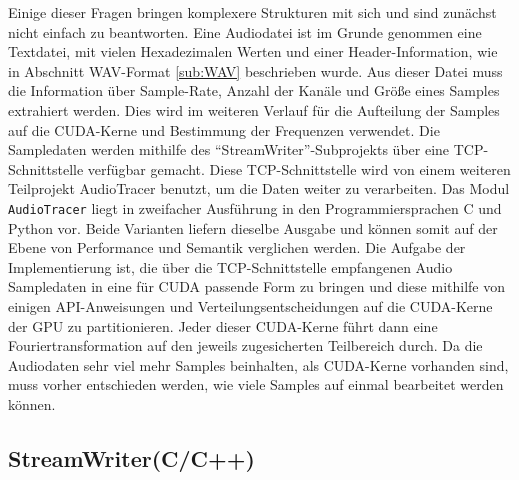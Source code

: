 Einige dieser Fragen bringen komplexere Strukturen mit sich und sind zunächst nicht einfach zu beantworten.
Eine Audiodatei ist im Grunde genommen eine Textdatei, mit vielen Hexadezimalen Werten und einer Header-Information, wie in Abschnitt WAV-Format \ref{sub:WAV} beschrieben wurde.
Aus dieser Datei muss die Information über Sample-Rate, Anzahl der Kanäle und Größe eines Samples extrahiert werden. Dies wird im weiteren Verlauf für die Aufteilung der Samples auf die CUDA-Kerne und Bestimmung der Frequenzen verwendet.
Die Sampledaten werden mithilfe des \enquote{StreamWriter}-Subprojekts über eine TCP-Schnittstelle verfügbar gemacht. Diese TCP-Schnittstelle wird von einem weiteren Teilprojekt AudioTracer benutzt, um die Daten weiter zu verarbeiten.
Das Modul \texttt{AudioTracer} liegt in zweifacher Ausführung in den Programmiersprachen C und Python vor. Beide Varianten liefern dieselbe Ausgabe und können somit auf der Ebene von Performance und Semantik verglichen werden. 
Die Aufgabe der Implementierung ist, die über die TCP-Schnittstelle empfangenen Audio Sampledaten in eine für CUDA passende Form zu bringen und diese mithilfe von einigen API-Anweisungen und Verteilungsentscheidungen auf die CUDA-Kerne der GPU zu partitionieren.
Jeder dieser CUDA-Kerne führt dann eine Fouriertransformation auf den jeweils zugesicherten Teilbereich durch. Da die Audiodaten sehr viel mehr Samples beinhalten, als CUDA-Kerne vorhanden sind, muss vorher entschieden werden, wie viele Samples auf einmal bearbeitet werden können.

\subsection{StreamWriter(C/C++)}

